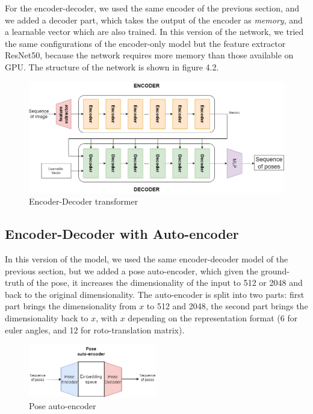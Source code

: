 For the encoder-decoder, we used the same encoder of the previous section, and we added a decoder part, which takes the output of the encoder as \textit{memory}, and a learnable vector which are also trained.
In this version of the network, we tried the same configurations of the encoder-only model but the feature extractor ResNet50, because the network requires more memory than those available on GPU.
The structure of the network is shown in figure 4.2.
\begin{figure}[H]
    \centering
    \includegraphics[width=\textwidth]{images/4_1_encoder_decoder}
    \caption{Encoder-Decoder transformer}\label{fig:figure-encoder-decoder-transformer}
\end{figure}

\subsection{Encoder-Decoder with Auto-encoder}\label{subsec:encoder-decoder-with-auto-encoder}
In this version of the model, we used the same encoder-decoder model of the previous section, but we added a pose auto-encoder, which given the ground-truth of the pose, it increases the dimensionality of the input to 512 or 2048 and back to the original dimensionality.
The auto-encoder is split into two parts: first part brings the dimensionality from $x$ to 512 and 2048, the second part brings the dimensionality back to $x$, with $x$ depending on the representation format (6 for euler angles, and 12 for roto-translation matrix).
\begin{figure}[H]
    \centering
    \includegraphics[width=0.5\textwidth]{images/4_1_pose_encoder}
    \caption{Pose auto-encoder}\label{fig:figure-pose-encoder}
\end{figure}

